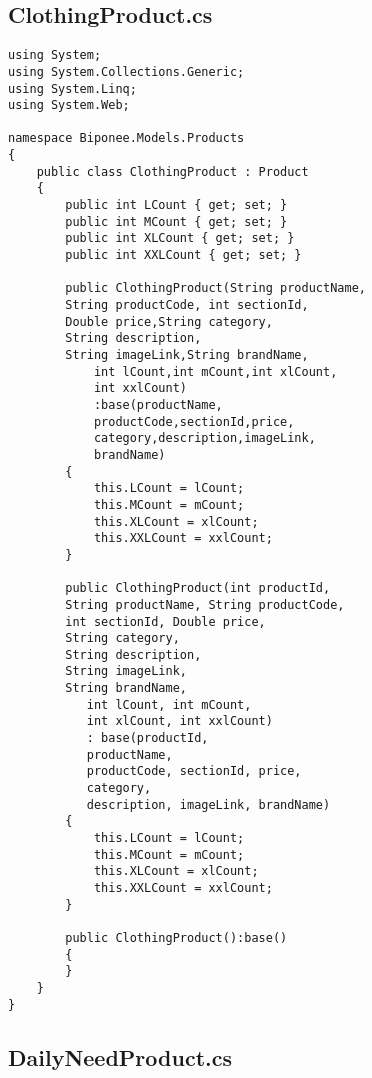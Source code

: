\subsection {ClothingProduct.cs}
\begin{lstlisting}
using System;
using System.Collections.Generic;
using System.Linq;
using System.Web;

namespace Biponee.Models.Products
{
    public class ClothingProduct : Product
    {
        public int LCount { get; set; }
        public int MCount { get; set; }
        public int XLCount { get; set; }
        public int XXLCount { get; set; }

        public ClothingProduct(String productName,
        String productCode, int sectionId,
        Double price,String category,
        String description,
        String imageLink,String brandName,
            int lCount,int mCount,int xlCount,
            int xxlCount) 
            :base(productName,
            productCode,sectionId,price,
            category,description,imageLink,
            brandName)
        {
            this.LCount = lCount;
            this.MCount = mCount;
            this.XLCount = xlCount;
            this.XXLCount = xxlCount;
        }

        public ClothingProduct(int productId,
        String productName, String productCode, 
        int sectionId, Double price, 
        String category, 
        String description, 
        String imageLink,
        String brandName,
           int lCount, int mCount, 
           int xlCount, int xxlCount) 
           : base(productId,
           productName, 
           productCode, sectionId, price, 
           category, 
           description, imageLink, brandName)
        {
            this.LCount = lCount;
            this.MCount = mCount;
            this.XLCount = xlCount;
            this.XXLCount = xxlCount;
        }

        public ClothingProduct():base()
        {
        }
    }
}

\end{lstlisting}
\newpage

\subsection{DailyNeedProduct.cs}

